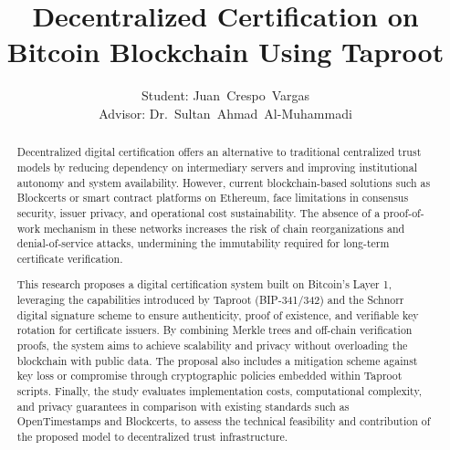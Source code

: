 \documentclass[10pt]{exam} %
\title{Decentralized Certification on Bitcoin Blockchain Using Taproot}
\author{Student: Juan~Crespo~Vargas\\Advisor: Dr.~Sultan~Ahmad~Al-Muhammadi}
\begin{document}
\maketitle


\begin{abstract}
    
Decentralized digital certification offers an alternative to traditional centralized trust models by reducing dependency on intermediary servers and improving institutional autonomy and system availability.
However, current blockchain-based solutions such as Blockcerts or smart contract platforms on Ethereum, face limitations in consensus security, issuer privacy, and operational cost sustainability.
The absence of a proof-of-work mechanism in these networks increases the risk of chain reorganizations and denial-of-service attacks, undermining the immutability required for long-term certificate verification.

This research proposes a digital certification system built on Bitcoin’s Layer 1, leveraging the capabilities introduced by Taproot (BIP-341/342) and the Schnorr digital signature scheme to ensure authenticity, proof of existence, and verifiable key rotation for certificate issuers.
By combining Merkle trees and off-chain verification proofs, the system aims to achieve scalability and privacy without overloading the blockchain with public data.
The proposal also includes a mitigation scheme against key loss or compromise through cryptographic policies embedded within Taproot scripts.
Finally, the study evaluates implementation costs, computational complexity, and privacy guarantees in comparison with existing standards such as OpenTimestamps and Blockcerts, to assess the technical feasibility and contribution of the proposed model to decentralized trust infrastructure.

\end{abstract}
\end{document}
